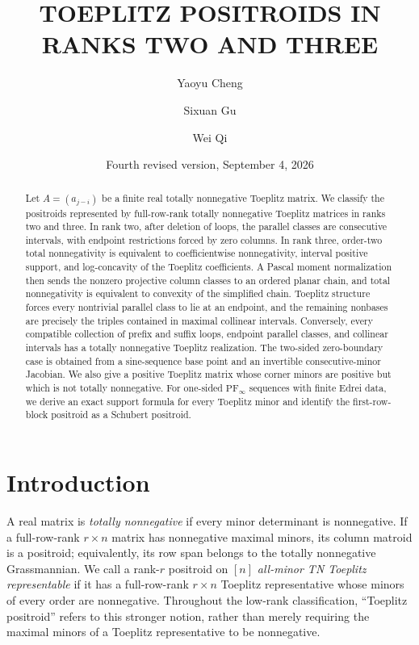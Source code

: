 \documentclass{amsart}
\title{TOEPLITZ POSITROIDS IN RANKS TWO AND THREE}
\date{Fourth revised version, September 4, 2026}
\author{Yaoyu Cheng}
\author{Sixuan Gu}
\author{Wei Qi}
\numberwithin{equation}{section}
\theoremstyle{definition}
\theoremstyle{remark}
\newcommand{\PFinfty}{\mathrm{PF}_{\infty}}
\begin{document}
\begin{abstract}
Let $A=(a_{j-i})$ be a finite real totally nonnegative Toeplitz matrix.  We classify the positroids represented by full-row-rank totally nonnegative Toeplitz matrices in ranks two and three.  In rank two, after deletion of loops, the parallel classes are consecutive intervals, with endpoint restrictions forced by zero columns.  In rank three, order-two total nonnegativity is equivalent to coefficientwise nonnegativity, interval positive support, and log-concavity of the Toeplitz coefficients.  A Pascal moment normalization then sends the nonzero projective column classes to an ordered planar chain, and total nonnegativity is equivalent to convexity of the simplified chain.  Toeplitz structure forces every nontrivial parallel class to lie at an endpoint, and the remaining nonbases are precisely the triples contained in maximal collinear intervals.  Conversely, every compatible collection of prefix and suffix loops, endpoint parallel classes, and collinear intervals has a totally nonnegative Toeplitz realization.  The two-sided zero-boundary case is obtained from a sine-sequence base point and an invertible consecutive-minor Jacobian.  We also give a positive Toeplitz matrix whose corner minors are positive but which is not totally nonnegative.  For one-sided $\PFinfty$ sequences with finite Edrei data, we derive an exact support formula for every Toeplitz minor and identify the first-row-block positroid as a Schubert positroid.
\end{abstract}

\maketitle

\section{Introduction}

A real matrix is \emph{totally nonnegative} if every minor determinant is nonnegative.  If a full-row-rank $r\times n$ matrix has nonnegative maximal minors, its column matroid is a positroid; equivalently, its row span belongs to the totally nonnegative Grassmannian.  We call a rank-$r$ positroid on $[n]$ \emph{all-minor TN Toeplitz representable} if it has a full-row-rank $r\times n$ Toeplitz representative whose minors of every order are nonnegative.  Throughout the low-rank classification, ``Toeplitz positroid'' refers to this stronger notion, rather than merely requiring the maximal minors of a Toeplitz representative to be nonnegative.
\end{document}
